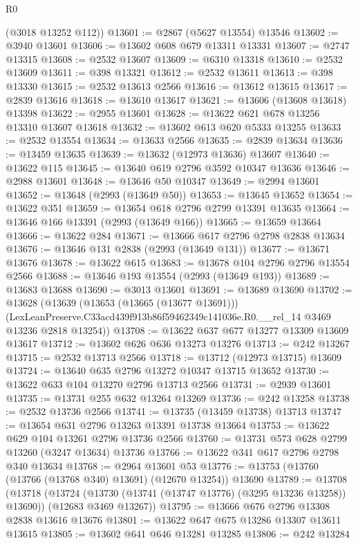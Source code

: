 \begin{lexlean}{R0}
\begin{coremodule}
      (@3018 @13252 @112))
@13601 := @2867 (@5627 @13554) @13546
@13602 := @3940 @13601
@13606 := @13602 @608 @679 @13311 @13331
@13607 := @2747 @13315
@13608 := @2532 @13607
@13609 := @6310 @13318
@13610 := @2532 @13609
@13611 := @398 @13321
@13612 := @2532 @13611
@13613 := @398 @13330
@13615 := @2532 @13613 @2566
@13616 := @13612 @13615
@13617 := @2839 @13616
@13618 := @13610 @13617
@13621 := @13606 (@13608 @13618) @13398
@13622 := @2955 @13601
@13628 := @13622 @621 @678 @13256 @13310 @13607 @13618
@13632 := @13602 @613 @620 @5333 @13255
@13633 := @2532 @13554
@13634 := @13633 @2566
@13635 := @2839 @13634
@13636 := @13459 @13635
@13639 := @13632 (@12973 @13636) @13607
@13640 := @13622 @115
@13645 := @13640 @619 @2796 @3592 @10347 @13636
@13646 := @2988 @13601
@13648 := @13646 @50 @10347
@13649 := @2994 @13601
@13652 := @13648 (@2993 (@13649 @50))
@13653 := @13645 @13652
@13654 := @13622 @351
@13659 := @13654 @618 @2796 @2799 @13391 @13635
@13664 := @13646 @166 @13391 (@2993 (@13649 @166))
@13665 := @13659 @13664
@13666 := @13622 @284
@13671 := @13666 @617 @2796 @2798 @2838 @13634
@13676 := @13646 @131 @2838 (@2993 (@13649 @131))
@13677 := @13671 @13676
@13678 := @13622 @615
@13683 := @13678 @104 @2796 @2796 @13554 @2566
@13688 := @13646 @193 @13554 (@2993 (@13649 @193))
@13689 := @13683 @13688
@13690 := @3013 @13601
@13691 := @13689 @13690
@13702 := @13628
    (@13639
      (@13653 (@13665 (@13677 @13691)))
      (LexLeanPreserve.C33acd439f913b86f59462349c141036e.R0.__rel_14 @3469 @13236 @2818 @13254))
@13708 := @13622 @637 @677 @13277 @13309 @13609 @13617
@13712 := @13602 @626 @636 @13273 @13276
@13713 := @242 @13267
@13715 := @2532 @13713 @2566
@13718 := @13712 (@12973 @13715) @13609
@13724 := @13640 @635 @2796 @13272 @10347 @13715 @13652
@13730 := @13622 @633 @104 @13270 @2796 @13713 @2566
@13731 := @2939 @13601
@13735 := @13731 @255 @632 @13264 @13269
@13736 := @242 @13258
@13738 := @2532 @13736 @2566
@13741 := @13735 (@13459 @13738) @13713
@13747 := @13654 @631 @2796 @13263 @13391 @13738 @13664
@13753 := @13622 @629 @104 @13261 @2796 @13736 @2566
@13760 := @13731 @573 @628 @2799 @13260 (@3247 @13634) @13736
@13766 := @13622 @341 @617 @2796 @2798 @340 @13634
@13768 := @2964 @13601 @53
@13776 := @13753 (@13760 (@13766 (@13768 @340) @13691) (@12670 @13254)) @13690
@13789 := @13708
    (@13718
      (@13724 (@13730 (@13741 (@13747 @13776) (@3295 @13236 @13258)) @13690))
      (@12683 @3469 @13267))
@13795 := @13666 @676 @2796 @13308 @2838 @13616 @13676
@13801 := @13622 @647 @675 @13286 @13307 @13611 @13615
@13805 := @13602 @641 @646 @13281 @13285
@13806 := @242 @13284

\end{coremodule}
\end{lexlean}
